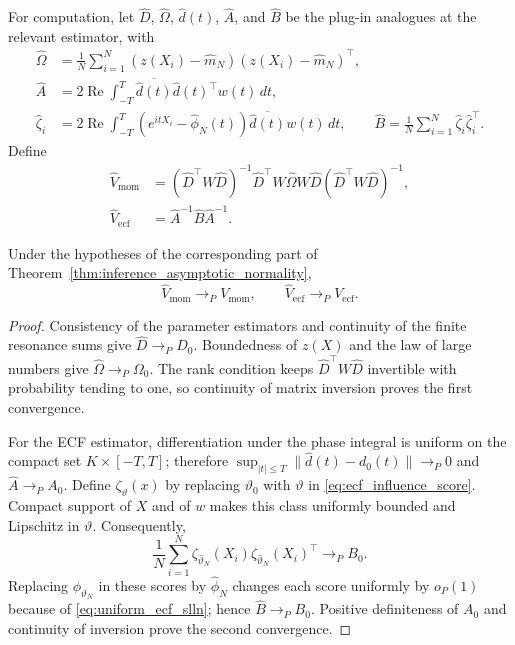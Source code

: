 \documentclass[11pt]{amsart}
\numberwithin{equation}{section}\setcounter{tocdepth}{3}\setcounter{secnumdepth}{3}
\begin{document}
For computation, let $\widehat D$, $\widehat\Omega$, $\widehat d(t)$,
$\widehat A$, and $\widehat B$ be the plug-in analogues at the relevant estimator, with
\begin{align}
 \widehat\Omega&=\frac1N\sum_{i=1}^N
 (z(X_i)-\widehat m_N)(z(X_i)-\widehat m_N)^\top,
 \label{eq:moment_covariance_estimator}\\
 \widehat A&=2\operatorname{Re}\int_{-T}^T
 \overline{\widehat d(t)}\widehat d(t)^\top w(t)\,dt,
 \label{eq:ecf_bread_estimator}\\
 \widehat\zeta_i&=2\operatorname{Re}\int_{-T}^T
 (e^{itX_i}-\widehat\phi_N(t))\overline{\widehat d(t)}w(t)\,dt,
 \qquad
 \widehat B=\frac1N\sum_{i=1}^N\widehat\zeta_i\widehat\zeta_i^\top.
 \label{eq:ecf_meat_estimator}
\end{align}
Define
\begin{align}
 \widehat V_{\mathrm{mom}}
 &= (\widehat D^\top W\widehat D)^{-1}\widehat D^\top W
    \widehat\Omega W\widehat D
    (\widehat D^\top W\widehat D)^{-1},
 \label{eq:moment_sandwich_estimator}\\
 \widehat V_{\mathrm{ecf}}
 &=\widehat A^{-1}\widehat B\widehat A^{-1}.
 \label{eq:ecf_sandwich_estimator}
\end{align}

\begin{proposition}
\label{prop:sandwich_consistency}
Under the hypotheses of the corresponding part of
Theorem~\ref{thm:inference_asymptotic_normality},
\begin{equation}
 \widehat V_{\mathrm{mom}}\longrightarrow_P V_{\mathrm{mom}},
 \qquad
 \widehat V_{\mathrm{ecf}}\longrightarrow_P V_{\mathrm{ecf}}.
 \label{eq:sandwich_consistency}
\end{equation}
\end{proposition}
\begin{proof}
Consistency of the parameter estimators and continuity of the finite resonance sums give
$\widehat D\to_P D_0$.  Boundedness of $z(X)$ and the law of large numbers give
$\widehat\Omega\to_P\Omega_0$.  The rank condition keeps
$\widehat D^\top W\widehat D$ invertible with probability tending to one, so continuity
of matrix inversion proves the first convergence.

For the ECF estimator, differentiation under the phase integral is uniform on the
compact set $K\times[-T,T]$; therefore
$\sup_{|t|\le T}\|\widehat d(t)-d_0(t)\|\to_P0$ and
$\widehat A\to_P A_0$.  Define $\zeta_\vartheta(x)$ by replacing
$\vartheta_0$ with $\vartheta$ in \eqref{eq:ecf_influence_score}.  Compact support of
$X$ and of $w$ makes this class uniformly bounded and Lipschitz in $\vartheta$.
Consequently,
\begin{equation}
 \frac1N\sum_{i=1}^N
 \zeta_{\widehat\vartheta_N}(X_i)
 \zeta_{\widehat\vartheta_N}(X_i)^\top
 \longrightarrow_P B_0.
 \label{eq:ecf_meat_uniform_lln}
\end{equation}
Replacing $\phi_{\widehat\vartheta_N}$ in these scores by $\widehat\phi_N$ changes each
score uniformly by $o_P(1)$ because of \eqref{eq:uniform_ecf_slln}; hence
$\widehat B\to_P B_0$.  Positive definiteness of $A_0$ and continuity of inversion prove
the second convergence.
\end{proof}
\end{document}
